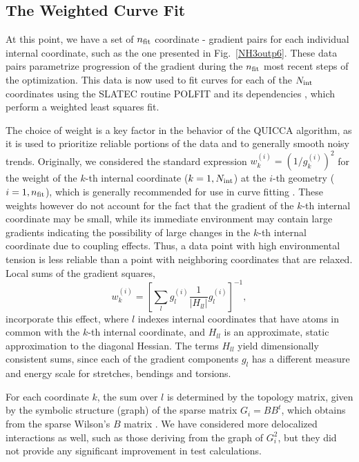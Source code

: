 \documentclass[prl,aps,preprint,superbib,12pt]{revtex4}
\begin{document}
\subsection{The Weighted Curve Fit} \label{Sweights}

At this point,  we have a set of $n_{\rm fit}$ coordinate - gradient pairs for each individual 
internal coordinate, such as the one presented in Fig.~\ref{NH3outp6}. These data 
pairs parametrize progression of the gradient during the $n_{\rm fit}$ most recent steps of the 
optimization.  This data is now used to fit curves for each of the $N_{\rm int}$ coordinates using the 
{\sc SLATEC} routine {\sc POLFIT} and its dependencies \cite{Slatec93}, which perform a weighted least squares fit.

The choice of weight is a key factor in the behavior of the QUICCA algorithm, as it is used to prioritize 
reliable portions of the data and to generally smooth noisy trends.  
Originally, we considered the standard expression $w_{k}^{(i)}=(1/{g_{k}^{(i)}})^2$ for the weight 
of the $k$-th internal coordinate ($k=1,N_{\rm int}$) at the $i$-th geometry
($i=1,n_{\rm fit}$), which is generally recommended for use in curve 
fitting \cite{WPress92}.  These weights however do not 
account for the fact that the gradient of the $k$-th internal coordinate may be small, while 
its immediate  environment may contain large gradients indicating the possibility of large changes in the $k$-th 
internal coordinate due to coupling effects.  Thus, a data point with high environmental tension 
is less reliable than a point with neighboring coordinates that are relaxed.   
Local sums of the gradient squares,
\begin{equation}
\label{weights}
w_{k}^{(i)} = \left[ \sum_{l} g_{l}^{(i)} \frac{1}{|H_{ll}^{}|} g_{l}^{(i)} \right]^{-1} ,
\end{equation}
incorporate this effect, where  $l$ indexes internal coordinates that have atoms in common with 
the $k$-th internal coordinate, and $H_{ll}^{}$ is an approximate, static approximation to the 
diagonal Hessian.  The terms $H_{ll}$ yield dimensionally consistent sums, since each of the gradient 
components  $g_{l}$ has a different measure and energy scale for stretches, bendings and torsions.  

For each coordinate $k$, the sum over $l$ is determined by the topology matrix, given by the symbolic 
structure (graph) of the sparse matrix $G_{i}=BB^{t}$, which obtains from the sparse Wilson's $B$ 
matrix \cite{EWilson55}.  We have considered more delocalized interactions as well, such as those deriving 
from the graph of $G_i^2$, but they did not provide any significant improvement in test calculations.
\end{document}
